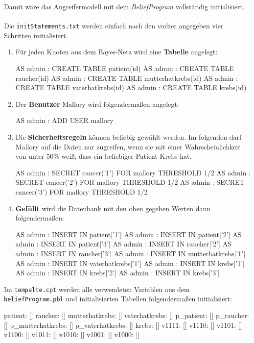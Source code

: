 \documentclass[german,version-2020-11]{uzl-thesis}
\begin{document}
Damit wäre das Angreifermodell mit dem \textit{BeliefProgram} vollständig initialisiert.\\ \\
Die \texttt{initStatements.txt} werden einfach nach den vorher angegeben vier Schritten initialisiert.
\begin{enumerate}
	\item  Für jeden Knoten aus dem Bayes-Netz wird eine \textbf{Tabelle} angelegt: 
\begin{Pseudocode}
AS admin : CREATE TABLE patient(id)
AS admin : CREATE TABLE raucher(id)
AS admin : CREATE TABLE mutterhatkrebs(id)
AS admin : CREATE TABLE vaterhatkrebs(id)
AS admin : CREATE TABLE krebs(id)
\end{Pseudocode}
\item Der \textbf{Benutzer} Mallory wird folgendermaßen angelegt:
\begin{Pseudocode}
AS admin : ADD USER mallory
\end{Pseudocode}
\item Die \textbf{Sicherheitsregeln} können beliebig gewählt werden. Im folgenden darf Mallory auf die Daten nur zugreifen, wenn sie mit einer Wahrscheinlichkeit von unter 50\% weiß, dass ein beliebiger Patient Krebs hat.
\begin{Pseudocode}
AS admin : SECRET cancer('1') FOR mallory THRESHOLD 1/2
AS admin : SECRET cancer('2') FOR mallory THRESHOLD 1/2
AS admin : SECRET cancer('3') FOR mallory THRESHOLD 1/2
\end{Pseudocode}
\item \textbf{Gefüllt} wird die Datenbank mit den oben gegeben Werten dann folgendermaßen:
\begin{Pseudocode}
AS admin : INSERT IN patient['1']
AS admin : INSERT IN patient['2']
AS admin : INSERT IN patient['3']
AS admin : INSERT IN raucher['2']
AS admin : INSERT IN raucher['3']
AS admin : INSERT IN mutterhatkrebs['1']
AS admin : INSERT IN vaterhatkrebs['1']
AS admin : INSERT IN krebs['1']
AS admin : INSERT IN krebs['2']
AS admin : INSERT IN krebs['3']
\end{Pseudocode}
\end{enumerate}
Im \texttt{tempalte.cpt} werden alle verwendeten Variablen aus dem \texttt{beliefProgram.pbl} und initialisierten Tabellen folgendermaßen initialisiert: 
\begin{Pseudocode}
patient: []
raucher: []
mutterhatkrebs: []
vaterhatkrebs: []
p_patient: []
p_raucher: []
p_mutterhatkrebs: []
p_vaterhatkrebs: []
krebs: []
v1111: []
v1110: []
v1101: []
v1100: []
v1011: []
v1010: []
v1001: []
v1000: []
\end{Pseudocode}
\end{document}
